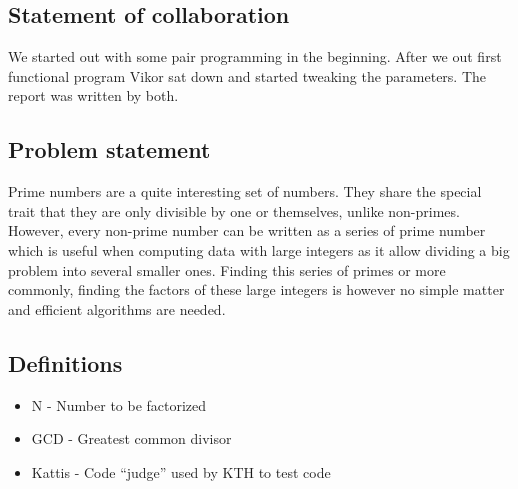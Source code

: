 \subsection{Statement of collaboration}
We started out with some pair programming in the beginning. After we out first functional program Vikor sat down and started tweaking the parameters. The report was written by both.  

\subsection{Problem statement}
Prime numbers are a quite interesting set of numbers. They share the special trait that they are only divisible by one or themselves, unlike non-primes. However, every non-prime number can be written as a series of prime number which is useful when computing data with large integers as it allow dividing a big problem into several smaller ones.
Finding this series of primes or more commonly, finding the factors of these large integers is however no simple matter and efficient algorithms are needed.

\subsection{Definitions}
	
\begin{itemize}
  \item N - Number to be factorized
  \item GCD - Greatest common divisor
  \item Kattis - Code “judge” used by KTH to test code
\end{itemize}